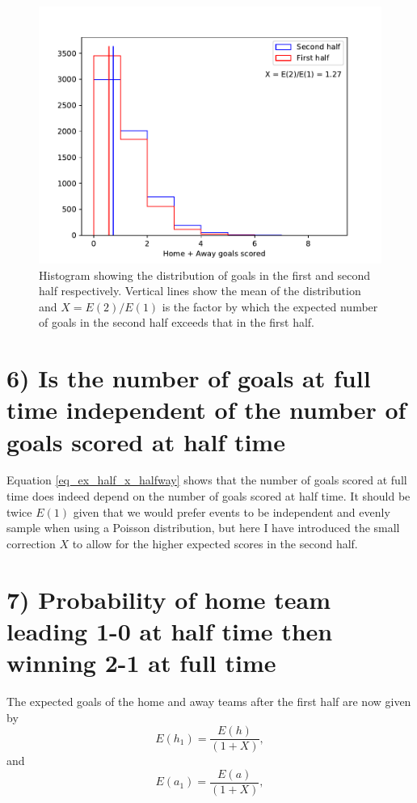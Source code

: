 \documentclass[10pt]{article}
\begin{document}
\begin{figure}
\begin{center}
\includegraphics[scale=1.0,angle=0,trim=0cm 0cm 0cm 0cm]{fig_1st_2nd_comp_tot.pdf}
\caption{Histogram showing the distribution of goals in the first and second half respectively. Vertical lines show the mean of the distribution and $X = E(2)/E(1)$ is the factor by which the expected number of goals in the second half exceeds that in the first half.}
\label{fig_hist12}
\end{center}
\end{figure} 






\section{6) Is the number of goals at full time independent of the number of goals scored at half time}

Equation \ref{eq_ex_half_x_halfway} shows that the number of goals scored at full time does indeed depend on the number of goals scored at half time. It should be twice $E(1)$ given that we would prefer events to be independent and evenly sample when using a Poisson distribution, but here I have introduced the small correction $X$ to allow for the higher expected scores in the second half. 




\section{7) Probability of home team leading 1-0 at half time then winning 2-1 at full time}
The expected goals of the home and away teams after the first half are now given by 
\begin{equation}
\label{eq_eh1}
E(h_1) =\frac{E(h)}{ \left(1 + X \right)},
\end{equation}
\noindent and
\begin{equation}
\label{eq_ea1}
E(a_1) =\frac{E(a)}{ \left(1 + X \right)},
\end{equation}
\end{document}
